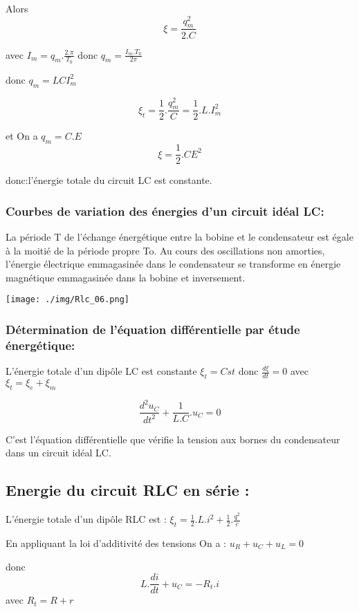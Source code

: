 \documentclass[12pt]{article}
\begin{document}
Alors $$\xi = \frac{q_m^2}{2.C}$$

avec $I_m = q_m.\frac{2.\pi}{T_0}$ donc $q_m = \frac{I_m.T_0}{2\pi}$

donc $q_m =LCI_m^2$

$$\xi_t = \frac{1}{2}.\frac{q_m^2}{C} = \frac{1}{2}.L.I_m^2$$


et On a $q_m = C.E$ $$\xi = \frac{1}{2}.CE^2$$

donc:l'énergie totale du circuit LC est constante.

\subsubsection{Courbes de variation des énergies d'un circuit idéal LC:}

La période T de l'échange énergétique entre la bobine et le condensateur est égale à la moitié de la période propre To.
Au cours des oscillations non amorties, l'énergie électrique emmagasinée dans le condensateur se transforme en énergie magnétique emmagasinée dans la bobine et inversement.


\begin{center}
	\texttt{[image: ./img/Rlc\_06.png]}
\end{center}

\subsubsection{Détermination de l'équation différentielle par étude énergétique: }

L'énergie totale d'un dipôle LC est constante $\xi_t = Cst$ donc $\frac{d\xi}{dt} = 0$ avec $\xi_t = \xi_e  + \xi_m$

$$\frac{d^2u_C}{dt^2} + \frac{1}{L.C}.u_C = 0$$

C'est l'équation différentielle que vérifie la tension aux bornes du condensateur dans un circuit idéal LC.

\subsection{Energie du circuit RLC en série : }

L'énergie totale d'un dipôle RLC est : $\xi_t = \frac{1}{2}.L.i^2 + \frac{1}{2}.\frac{q^2}{c}$

En appliquant la loi d'additivité des tensions On a : $u_R + u_C + u_L = 0$

donc $$L.\frac{di}{dt} + u_C = -R_t.i$$ avec $ R_t =R + r $
\end{document}
